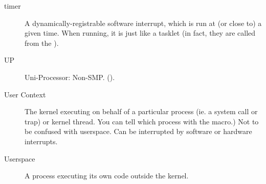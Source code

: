 \documentclass[a4paper,8pt,english]{sphinxmanual}
\begin{document}
\begin{description}
\item[{timer}] \leavevmode
A dynamically-registrable software interrupt, which is run at (or close
to) a given time. When running, it is just like a tasklet (in fact, they
are called from the ).

\item[{UP}] \leavevmode
Uni-Processor: Non-SMP. ().

\item[{User Context}] \leavevmode
The kernel executing on behalf of a particular process (ie. a system
call or trap) or kernel thread. You can tell which process with the
 macro.) Not to be confused with userspace. Can be
interrupted by software or hardware interrupts.

\item[{Userspace}] \leavevmode
A process executing its own code outside the kernel.

\end{description}



\renewcommand{\indexname}{Index}
\printindex
\end{document}
